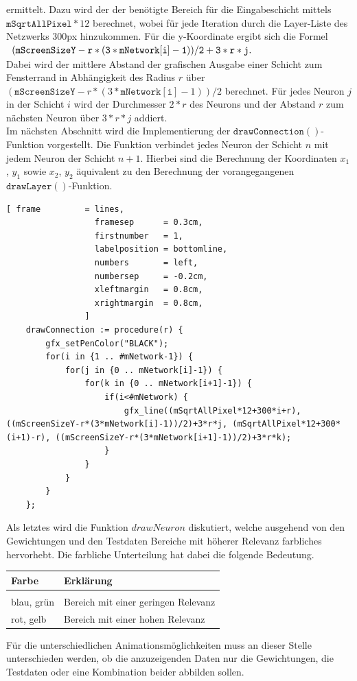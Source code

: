 ermittelt. Dazu wird der der benötigte Bereich für die Eingabeschicht mittels $\mathtt{mSqrtAllPixel}*12$ berechnet, wobei für jede Iteration durch die Layer-Liste des Netzwerks 300px hinzukommen. Für die y-Koordinate ergibt sich die Formel \\[0.2cm]
\hspace*{1.3cm}
$
\begin{array}[t]{lclll}
	\mathtt{(mScreenSizeY-r*(3*mNetwork[i]-1))/2+3*r*j}.
\end{array}
$ 
\\[0.2cm]
Dabei wird der mittlere Abstand der grafischen Ausgabe einer Schicht zum Fensterrand in Abhängigkeit des Radius $r$ über $(\mathtt{mScreenSizeY}-r*(3*\mathtt{mNetwork[i]}-1))/2$ berechnet. Für jedes Neuron $j$ in der Schicht $i$ wird der Durchmesser $2*r$ des Neurons und der Abstand $r$ zum nächsten Neuron über $3*r*j$ addiert. \\

\noindent
Im nächsten Abschnitt wird die Implementierung der $\mathtt{drawConnection()}$-Funktion vorgestellt. Die Funktion verbindet jedes Neuron der Schicht $n$ mit jedem Neuron der Schicht $n+1$. Hierbei sind die Berechnung der Koordinaten $x_1$, $y_1$ sowie $x_2$, $y_2$ äquivalent zu den Berechnung der vorangegangenen $\mathtt{drawLayer()}$-Funktion.
\begin{Verbatim}[ frame         = lines, 
                  framesep      = 0.3cm, 
                  firstnumber   = 1,
                  labelposition = bottomline,
                  numbers       = left,
                  numbersep     = -0.2cm,
                  xleftmargin   = 0.8cm,
                  xrightmargin  = 0.8cm,
                ]
    drawConnection := procedure(r) {
        gfx_setPenColor("BLACK");
        for(i in {1 .. #mNetwork-1}) {	
            for(j in {0 .. mNetwork[i]-1}) {
                for(k in {0 .. mNetwork[i+1]-1}) {
                    if(i<#mNetwork) {
                        gfx_line((mSqrtAllPixel*12+300*i+r), ((mScreenSizeY-r*(3*mNetwork[i]-1))/2)+3*r*j, (mSqrtAllPixel*12+300*(i+1)-r), ((mScreenSizeY-r*(3*mNetwork[i+1]-1))/2)+3*r*k);
                    }	
                }
            }		
        }
    };
\end{Verbatim}
Als letztes wird die Funktion $drawNeuron$ diskutiert, welche ausgehend von den Gewichtungen und den Testdaten Bereiche mit höherer Relevanz farbliches hervorhebt. Die farbliche Unterteilung hat dabei die folgende Bedeutung.
\begin{center}
\begin{tabular}{lp{6cm}}
\textbf{Farbe}   & \textbf{Erklärung} \\
\hline \\
blau, grün & Bereich mit einer geringen Relevanz \\[0.2cm]
rot, gelb  & Bereich mit einer hohen Relevanz   \\
\end{tabular}
\end{center}
Für die unterschiedlichen Animationsmöglichkeiten muss an dieser Stelle unterschieden werden, ob die anzuzeigenden Daten nur die Gewichtungen, die Testdaten oder eine Kombination beider abbilden sollen. 